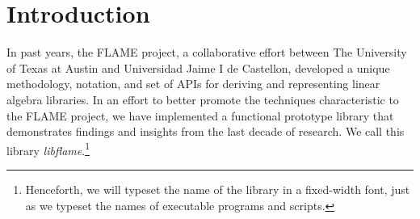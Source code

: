\chapter{Introduction}
\label{chapter:intro}

In past years, the FLAME project, a collaborative effort between The
University of Texas at Austin and Universidad Jaime I de Castellon, 
developed a unique methodology, notation, and set of APIs for deriving
and representing linear algebra libraries.
In an effort to better promote the techniques characteristic to the FLAME
project, we have implemented a functional prototype library that demonstrates
findings and insights from the last decade of research.
We call this library {\em libflame}.\footnote{Henceforth, we will typeset
the name of the library in a fixed-width font, just as we typeset the names of
executable programs and scripts.}

